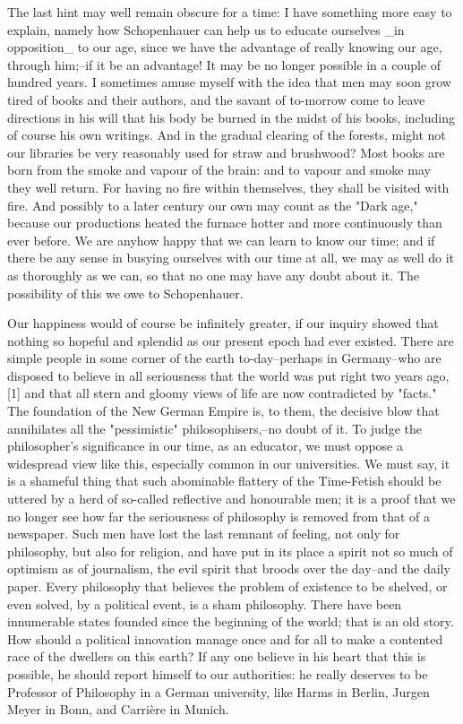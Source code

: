 The last hint may well remain obscure for a time: I have something
more easy to explain, namely how Schopenhauer can help us to educate
ourselves _in opposition_ to our age, since we have the advantage of
really knowing our age, through him;--if it be an advantage! It may
be no longer possible in a couple of hundred years. I sometimes amuse
myself with the idea that men may soon grow tired of books and their
authors, and the savant of to-morrow come to leave directions in his
will that his body be burned in the midst of his books, including of
course his own writings. And in the gradual clearing of the forests,
might not our libraries be very reasonably used for straw and
brushwood? Most books are born from the smoke and vapour of the
brain: and to vapour and smoke may they well return. For having no
fire within themselves, they shall be visited with fire. And possibly
to a later century our own may count as the "Dark age," because our
productions heated the furnace hotter and more continuously than ever
before. We are anyhow happy that we can learn to know our time; and
if there be any sense in busying ourselves with our time at all, we
may as well do it as thoroughly as we can, so that no one may have
any doubt about it. The possibility of this we owe to Schopenhauer.

Our happiness would of course be infinitely greater, if our inquiry
showed that nothing so hopeful and splendid as our present epoch had
ever existed. There are simple people in some corner of the earth
to-day--perhaps in Germany--who are disposed to believe in all
seriousness that the world was put right two years ago,[1] and that
all stern and gloomy views of life are now contradicted by "facts."
The foundation of the New German Empire is, to them, the decisive
blow that annihilates all the "pessimistic" philosophisers,--no doubt
of it. To judge the philosopher's significance in our time, as an
educator, we must oppose a widespread view like this, especially
common in our universities. We must say, it is a shameful thing that
such abominable flattery of the Time-Fetish should be uttered by a
herd of so-called reflective and honourable men; it is a proof that
we no longer see how far the seriousness of philosophy is removed
from that of a newspaper. Such men have lost the last remnant of
feeling, not only for philosophy, but also for religion, and have put
in its place a spirit not so much of optimism as of journalism, the
evil spirit that broods over the day--and the daily paper. Every
philosophy that believes the problem of existence to be shelved, or
even solved, by a political event, is a sham philosophy. There have
been innumerable states founded since the beginning of the world;
that is an old story. How should a political innovation manage once
and for all to make a contented race of the dwellers on this earth?
If any one believe in his heart that this is possible, he should
report himself to our authorities: he really deserves to be Professor
of Philosophy in a German university, like Harms in Berlin, Jurgen
Meyer in Bonn, and Carrière in Munich.

